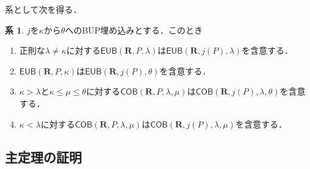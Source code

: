 \documentclass[uplatex,dvipdfmx]{jsarticle}
\newcommand{\EUB}{\mathsf{EUB}}
\newcommand{\COB}{\mathsf{COB}}
\newcommand{\relR}{\mathbf{R}}
\theoremstyle{definition}
\newtheorem{cor}[thm]{系}
\begin{document}
	系として次を得る．
		
		
	\begin{cor}\label{cor:bbb}
		$j$を$\kappa$から$\theta$へのBUP埋め込みとする．このとき
		\begin{enumerate}	
			\item\label{item:linerapreservedcor} 正則な$\lambda\ne\kappa$に対する$\EUB(\relR, P,\lambda)$は$\EUB(\relR, j(P),\lambda)$を含意する．
			\item\label{item:linerapreservedcorb}
			$\EUB(\relR, P,\kappa)$は$\EUB(\relR, j(P),\theta)$を含意する．
			\item\label{item:partialpreservedcor}
			$\kappa> \lambda$と$\kappa\le\mu\le\theta$に対する$\COB(\relR, P,\lambda,\mu)$は$\COB(\relR, j(P),\lambda,\theta)$を含意する．
			\item\label{item:partialpreservedcord}
			$\kappa< \lambda$に対する$\COB(\relR, P,\lambda,\mu)$は$\COB(\relR, j(P),\lambda,\mu)$を含意する．
		\end{enumerate}
	\end{cor}

	\subsection{主定理の証明}
\end{document}
